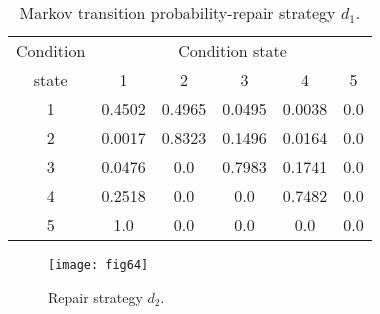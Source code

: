 \begin{table}[t]
\caption{Markov transition probability-repair strategy $d_1$.}
\label{table63}
\begin{center}
{\small
\begin{tabular}{l|lllll}
\hline
\multicolumn{1}{c|}{Condition} & \multicolumn{5}{c}{Condition state} \\ 
\multicolumn{1}{c|}{state} & \multicolumn{1}{c}{1} & \multicolumn{1}{c}{2} & \multicolumn{1}{c}{3} & \multicolumn{1}{c}{4} & \multicolumn{1}{c}{5} \\ 
\hline
\multicolumn{1}{c|}{1} & \multicolumn{1}{c}{0.4502} & \multicolumn{1}{c}{0.4965} & \multicolumn{1}{c}{0.0495} & \multicolumn{1}{c}{0.0038} & \multicolumn{1}{c}{0.0} \\ 
\multicolumn{1}{c|}{2} & \multicolumn{1}{c}{0.0017} & \multicolumn{1}{c}{0.8323} & \multicolumn{1}{c}{0.1496} & \multicolumn{1}{c}{0.0164} & \multicolumn{1}{c}{0.0} \\ 
\multicolumn{1}{c|}{3} & \multicolumn{1}{c}{0.0476} & \multicolumn{1}{c}{0.0} & \multicolumn{1}{c}{0.7983} & \multicolumn{1}{c}{0.1741} & \multicolumn{1}{c}{0.0} \\ 
\multicolumn{1}{c|}{4} & \multicolumn{1}{c}{0.2518} & \multicolumn{1}{c}{0.0} & \multicolumn{1}{c}{0.0} & \multicolumn{1}{c}{0.7482} & \multicolumn{1}{c}{0.0} \\ 
\multicolumn{1}{c|}{5} & \multicolumn{1}{c}{1.0} & \multicolumn{1}{c}{0.0} & \multicolumn{1}{c}{0.0} & \multicolumn{1}{c}{0.0} & \multicolumn{1}{c}{0.0} \\ 
\hline
\end{tabular}
}
\end{center}
\end{table}
%
\begin{figure}[t]
\begin{center}
\texttt{[image: fig64]}
\end{center}
\caption{Repair strategy $d_2$.}
\label{fig64}
\end{figure}
%
